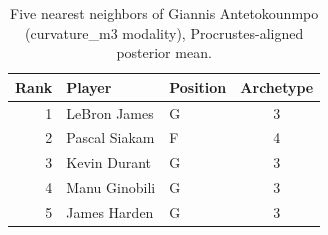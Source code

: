 \begin{table}[htbp]
  \centering\small
  \begin{tabular}{rllc}
    \toprule
    Rank & Player & Position & Archetype \\
    \midrule
    1 & LeBron James & G & 3 \\
    2 & Pascal Siakam & F & 4 \\
    3 & Kevin Durant & G & 3 \\
    4 & Manu Ginobili & G & 3 \\
    5 & James Harden & G & 3 \\
    \bottomrule
  \end{tabular}
  \caption{Five nearest neighbors of Giannis Antetokounmpo (curvature_m3 modality), Procrustes-aligned posterior mean.}
  \label{tab:Giannis_Antetokounmpo_neighbors_curvature_m3}
\end{table}

